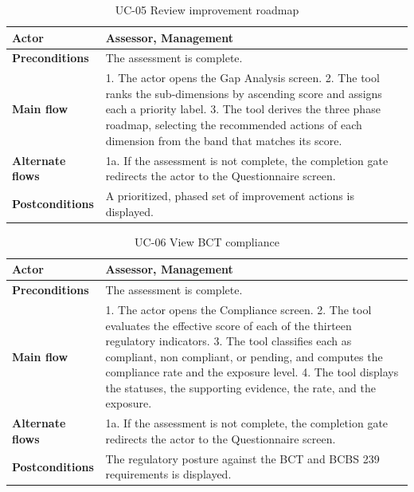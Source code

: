 \begin{table}[H]
\centering
\caption{UC-05 Review improvement roadmap}
\label{tab:uc05}
\begin{tabular}{|p{3cm}|p{12cm}|}
\hline
\textbf{Actor} & Assessor, Management \\
\hline
\textbf{Preconditions} & The assessment is complete. \\
\hline
\textbf{Main flow} & 1. The actor opens the Gap Analysis screen. 2. The tool ranks the sub-dimensions by ascending score and assigns each a priority label. 3. The tool derives the three phase roadmap, selecting the recommended actions of each dimension from the band that matches its score. \\
\hline
\textbf{Alternate flows} & 1a. If the assessment is not complete, the completion gate redirects the actor to the Questionnaire screen. \\
\hline
\textbf{Postconditions} & A prioritized, phased set of improvement actions is displayed. \\
\hline
\end{tabular}
\end{table}

\begin{table}[H]
\centering
\caption{UC-06 View BCT compliance}
\label{tab:uc06}
\begin{tabular}{|p{3cm}|p{12cm}|}
\hline
\textbf{Actor} & Assessor, Management \\
\hline
\textbf{Preconditions} & The assessment is complete. \\
\hline
\textbf{Main flow} & 1. The actor opens the Compliance screen. 2. The tool evaluates the effective score of each of the thirteen regulatory indicators. 3. The tool classifies each as compliant, non compliant, or pending, and computes the compliance rate and the exposure level. 4. The tool displays the statuses, the supporting evidence, the rate, and the exposure. \\
\hline
\textbf{Alternate flows} & 1a. If the assessment is not complete, the completion gate redirects the actor to the Questionnaire screen. \\
\hline
\textbf{Postconditions} & The regulatory posture against the BCT and BCBS 239 requirements is displayed. \\
\hline
\end{tabular}
\end{table}

